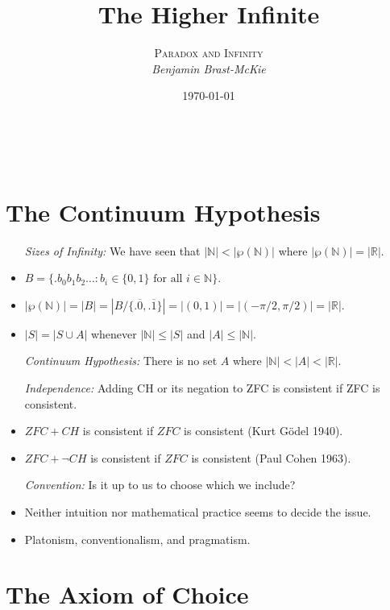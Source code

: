 \documentclass[a4paper, 11pt]{article} %
\title{\textbf{The Higher Infinite}} %
\author{\textsc{Paradox and Infinity}\\ \em Benjamin Brast-McKie} %
\date{\today} %
\makeatletter
\newcommand{\set}[1]{\lbrace#1\rbrace} %
\newcommand{\abs}[1]{|#1|} %
\newcommand{\N}{\mathbb{N}}
\newcommand{\R}{\mathbb{R}}
\renewcommand{\maketitle}{ %
\begin{flushright} %
{\LARGE\@title} %

\vspace{10pt} %

{\@author} %
\\\@date %

\vspace{0pt} %
\end{flushright}
}
\makeatother
\begin{document}
\maketitle %

\thispagestyle{empty}



\section*{The Continuum Hypothesis}

\begin{itemize}
  \item[\it Sizes of Infinity:] We have seen that $\abs{\N} < \abs{\wp(\N)}$ where $\abs{\wp(\N)} = \abs{\R}$. 
    \item $B=\set{.b_0b_1b_2\ldots : b_i \in \set{0, 1} \text{ for all } i \in \N}$.
    \item $\abs{\wp(\N)} = \abs{B} = \abs{B/\set{.\overline{0},.\overline{1}}} = \abs{(0,1)} = \abs{(-\pi/2,\pi/2)} = \abs{\R}$.
    \item $\abs{S} = \abs{S \cup A}$ whenever $\abs{\N} \leq \abs{S}$ and $\abs{A} \leq \abs{\N}$.
  \item[\it Continuum Hypothesis:] There is no set $A$ where $\abs{\N} < \abs{A} < \abs{\R}$.
  \item[\it Independence:] Adding CH or its negation to ZFC is consistent if ZFC is consistent.
  \item $ZFC+CH$ is consistent if $ZFC$ is consistent (Kurt G\"{o}del 1940).
  \item $ZFC+\neg CH$ is consistent if $ZFC$ is consistent (Paul Cohen 1963).
  \item[\it Convention:] Is it up to us to choose which we include?
  \item Neither intuition nor mathematical practice seems to decide the issue.
  \item Platonism, conventionalism, and pragmatism.
\end{itemize}



\section*{The Axiom of Choice}
\end{document}
